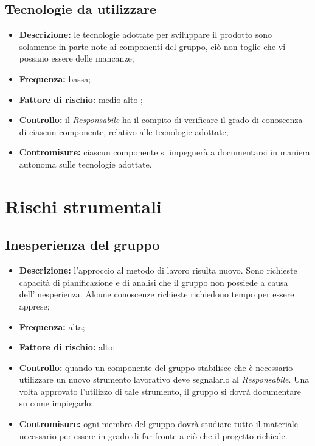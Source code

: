 \documentclass[../PianodiProgetto.tex]{subfiles}
\begin{document}
	\subsection{Tecnologie da utilizzare}
	\begin{itemize}
		\item \textbf{Descrizione:} le tecnologie adottate per sviluppare il prodotto sono solamente in parte note ai componenti del gruppo, ciò non toglie che vi possano essere delle mancanze;
		\item \textbf{Frequenza:} bassa;
		\item \textbf{Fattore di rischio:} medio-alto ;
		\item \textbf{Controllo:} il \textit{Responsabile} ha il compito di verificare il grado di conoscenza di ciascun componente, relativo alle tecnologie adottate;
		\item \textbf{Contromisure:} ciascun componente si impegnerà a documentarsi in maniera autonoma sulle tecnologie adottate. 
	\end{itemize}
	
	\section{Rischi strumentali}
	\subsection{Inesperienza del gruppo}
	\begin{itemize}
		\item \textbf{Descrizione:} l'approccio al metodo di lavoro risulta nuovo. Sono richieste capacità di pianificazione e di analisi che il gruppo non possiede a causa dell'inesperienza. Alcune conoscenze richieste richiedono tempo per essere apprese;
		\item \textbf{Frequenza:} alta;
		\item \textbf{Fattore di rischio:} alto;
		\item \textbf{Controllo:} quando un componente del gruppo stabilisce che è necessario utilizzare un nuovo strumento lavorativo deve segnalarlo al  \textit{Responsabile}. Una volta approvato l'utilizzo di tale strumento, il gruppo si dovrà documentare su come impiegarlo;
		\item \textbf{Contromisure:} ogni membro del gruppo dovrà studiare tutto il materiale necessario per essere in grado di far fronte  a ciò che il progetto richiede.
	\end{itemize}
	
\end{document}
